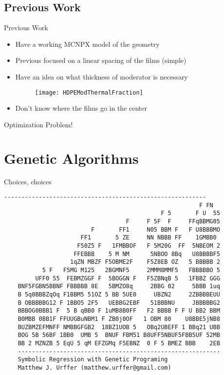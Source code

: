 \documentclass[compress]{beamer}
\begin{document}
\subsection{Previous Work}
\begin{frame}{Previous Work}
\begin{itemize}
	\small
	\item Have a working MCNPX model of the geometry
	\item Previous focused on a linear spacing of the films (simple)
	\item Have an idea on what thickness of moderator is necessary
		\begin{figure}
			\centering
			\texttt{[image: HDPEModThermalFraction]}
		\end{figure}
	\item Don't know where the films go in the center
\end{itemize}
\centering
Optimization Problem!
\end{frame}
\section{Genetic Algorithms}

\begin{frame}[fragile]{Choices, choices}
\centering
\tiny
\begin{Verbatim}[frame=single]
    ----------------------------------------------------------
                                                        F FN  
                                             F 5       F U  55
                                   F     F 5F  F     FFqBBMG05
                         F       FF1     N05 BBM F   F U8BBBMO
                      FF1       5 ZE     NN NBBB FF    1GMBB0 
                     F50Z5 F   1FMBBOF   F 5M20G  FF  5NBEOM 2
                    FFEBBB    5 M NM      5NBOO 8Bq   U8BBBBF5
                   1qZN MBZF F5OBME2F    F5Z8EB OZ   5 BBBBB 2
           5 F   F5MG M125   2BGMNF5     2MMM8MMF5   FBBBBBO 5
         UFF0 55  FEBMZGGF F  5BOGGN F   F5ZBNqB 5   1FBBZ GGG
    BNF5FGBN5BBNF FBBBBB 8E   5BMZO8q     2BBG 02     5BBB 1uq
    B 5q0BBBZqOq F1BBM5 51OZ 5 BB 5UE0     UBZN2     2ZBBBBEUU
    B OBBBBBG12 F 1BBO5 2F5   UEBBG2EBF   51BBBNU     JBBBBBG2
    BBBOG0BBB1 F  5 B qBB0 F 1uMB8B0FF   F2 BBBB F F U BB2 BBM
    B0MBB 0BB1F FFUUGBuNBM1 F ZB0j0OF   1 OBM 80    U8BBE5jNB8
    BUZBMZEFMNFF NMBBGFGB2  18BZ1UOB 5   OBq2UBEFF 1 BBq21 UBB
    BOG 5B 56BF 1BB0  UMB 5  BNUF FBM51 B8UFF5NBUF5FBB5UF 52MB
    BB 2 MZNZB 5 EqU 5 qM EFZGMq F5EBNZ  0 F 5 BMEZ BBB    2EB 
    ----------------------------------------------------------
    Symbolic Regression with Genetic Programing
    Matthew J. Urffer (matthew.urffer@gmail.com)
\end{Verbatim}
\end{frame}
\end{document}
